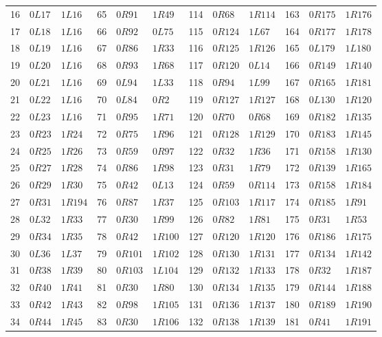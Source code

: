 \begin{longtable}{@{}rll@{\quad}rll@{\quad}rll@{\quad}rll@{}}
16 & $0L17$ & $1L16$ & 65 & $0R91$ & $1R49$ & 114 & $0R68$ & $1R114$ & 163 & $0R175$ & $1R176$ \\
17 & $0L18$ & $1L16$ & 66 & $0R92$ & $0L75$ & 115 & $0R124$ & $1L67$ & 164 & $0R177$ & $1R178$ \\
18 & $0L19$ & $1L16$ & 67 & $0R86$ & $1R33$ & 116 & $0R125$ & $1R126$ & 165 & $0L179$ & $1L180$ \\
19 & $0L20$ & $1L16$ & 68 & $0R93$ & $1R68$ & 117 & $0R120$ & $0L14$ & 166 & $0R149$ & $1R140$ \\
20 & $0L21$ & $1L16$ & 69 & $0L94$ & $1L33$ & 118 & $0R94$ & $1L99$ & 167 & $0R165$ & $1R181$ \\
21 & $0L22$ & $1L16$ & 70 & $0L84$ & $0R2$ & 119 & $0R127$ & $1R127$ & 168 & $0L130$ & $1R120$ \\
22 & $0L23$ & $1L16$ & 71 & $0R95$ & $1R71$ & 120 & $0R70$ & $0R68$ & 169 & $0R182$ & $1R135$ \\
23 & $0R23$ & $1R24$ & 72 & $0R75$ & $1R96$ & 121 & $0R128$ & $1R129$ & 170 & $0R183$ & $1R145$ \\
24 & $0R25$ & $1R26$ & 73 & $0R59$ & $0R97$ & 122 & $0R32$ & $1R36$ & 171 & $0R158$ & $1R130$ \\
25 & $0R27$ & $1R28$ & 74 & $0R86$ & $1R98$ & 123 & $0R31$ & $1R79$ & 172 & $0R139$ & $1R165$ \\
26 & $0R29$ & $1R30$ & 75 & $0R42$ & $0L13$ & 124 & $0R59$ & $0R114$ & 173 & $0R158$ & $1R184$ \\
27 & $0R31$ & $1R194$ & 76 & $0R87$ & $1R37$ & 125 & $0R103$ & $1R117$ & 174 & $0R185$ & $1R91$ \\
28 & $0L32$ & $1R33$ & 77 & $0R30$ & $1R99$ & 126 & $0R82$ & $1R81$ & 175 & $0R31$ & $1R53$ \\
29 & $0R34$ & $1R35$ & 78 & $0R42$ & $1R100$ & 127 & $0R120$ & $1R120$ & 176 & $0R186$ & $1R175$ \\
30 & $0L36$ & $1L37$ & 79 & $0R101$ & $1R102$ & 128 & $0R130$ & $1R131$ & 177 & $0R134$ & $1R142$ \\
31 & $0R38$ & $1R39$ & 80 & $0R103$ & $1L104$ & 129 & $0R132$ & $1R133$ & 178 & $0R32$ & $1R187$ \\
32 & $0R40$ & $1R41$ & 81 & $0R30$ & $1R80$ & 130 & $0R134$ & $1R135$ & 179 & $0R144$ & $1R188$ \\
33 & $0R42$ & $1R43$ & 82 & $0R98$ & $1R105$ & 131 & $0R136$ & $1R137$ & 180 & $0R189$ & $1R190$ \\
34 & $0R44$ & $1R45$ & 83 & $0R30$ & $1R106$ & 132 & $0R138$ & $1R139$ & 181 & $0R41$ & $1R191$ \\

\end{longtable}
